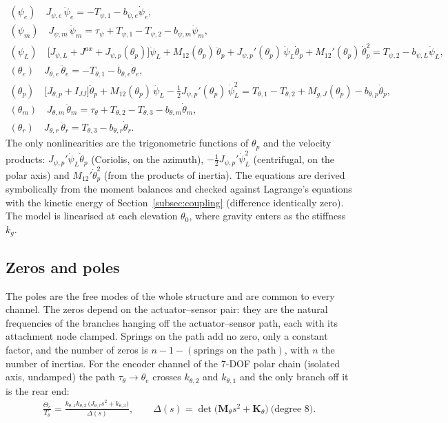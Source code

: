 \documentclass[10pt,a4paper]{article}
\numberwithin{equation}{section}
\begin{document}
\begin{gather}
(\psi_e)\quad J_{\psi,e}\,\ddot\psi_e = -T_{\psi,1} - b_{\psi,e}\dot\psi_e, \label{eq:ne_psie}\\
(\psi_m)\quad J_{\psi,m}\,\ddot\psi_m = \tau_\psi + T_{\psi,1} - T_{\psi,2} - b_{\psi,m}\dot\psi_m, \label{eq:ne_psim}\\
(\psi_L)\quad \bigl[J_{\psi,L} + J^{ax} + J_{\psi,p}(\theta_p)\bigr]\ddot\psi_L + M_{12}(\theta_p)\,\ddot\theta_p + J_{\psi,p}'(\theta_p)\,\dot\psi_L\dot\theta_p + M_{12}'(\theta_p)\,\dot\theta_p^2 = T_{\psi,2} - b_{\psi,L}\dot\psi_L, \label{eq:ne_psiL}\\
(\theta_e)\quad J_{\theta,e}\,\ddot\theta_e = -T_{\theta,1} - b_{\theta,e}\dot\theta_e, \label{eq:ne_the}\\
(\theta_p)\quad \bigl[J_{\theta,p} + I_{JJ}\bigr]\ddot\theta_p + M_{12}(\theta_p)\,\ddot\psi_L - \tfrac12 J_{\psi,p}'(\theta_p)\,\dot\psi_L^2 = T_{\theta,1} - T_{\theta,2} + M_{g,J}(\theta_p) - b_{\theta,p}\dot\theta_p, \label{eq:ne_thp}\\
(\theta_m)\quad J_{\theta,m}\,\ddot\theta_m = \tau_\theta + T_{\theta,2} - T_{\theta,3} - b_{\theta,m}\dot\theta_m, \label{eq:ne_thm}\\
(\theta_r)\quad J_{\theta,r}\,\ddot\theta_r = T_{\theta,3} - b_{\theta,r}\dot\theta_r. \label{eq:ne_thr}
\end{gather}
The only nonlinearities are the trigonometric functions of $\theta_p$ and the velocity products: $J_{\psi,p}'\dot\psi_L\dot\theta_p$ (Coriolis, on the azimuth), $-\tfrac12 J_{\psi,p}'\dot\psi_L^2$ (centrifugal, on the polar axis) and $M_{12}'\dot\theta_p^2$ (from the products of inertia). The equations are derived symbolically from the moment balances and checked against Lagrange's equations with the kinetic energy of Section~\ref{subsec:coupling} (difference identically zero). The model is linearised at each elevation $\theta_0$, where gravity enters as the stiffness $k_g$.
\subsection{Zeros and poles}\label{subsec:zeros7}
The poles are the free modes of the whole structure and are common to every channel. The zeros depend on the actuator--sensor pair: they are the natural frequencies of the branches hanging off the actuator--sensor path, each with its attachment node clamped. Springs on the path add no zero, only a constant factor, and the number of zeros is $n - 1 - (\text{springs on the path})$, with $n$ the number of inertias. For the encoder channel of the 7-DOF polar chain (isolated axis, undamped) the path $\tau_\theta\to\theta_e$ crosses $k_{\theta,2}$ and $k_{\theta,1}$ and the only branch off it is the rear end:
\begin{gather}
\frac{\Theta_e}{T_\theta} = \frac{k_{\theta,1}k_{\theta,2}\,\bigl(J_{\theta,r}s^2 + k_{\theta,3}\bigr)}{\Delta(s)},\qquad \Delta(s) = \det\bigl(\mathbf M_\theta s^2 + \mathbf K_\theta\bigr)\ \text{(degree 8)}.\label{eq:tf7}
\end{gather}
\end{document}
